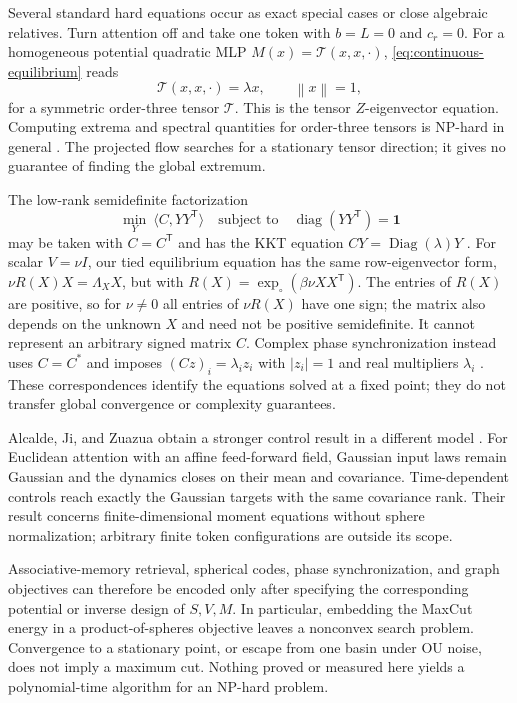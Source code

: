 \documentclass[11pt,a4paper]{article}
\theoremstyle{definition}
\newcommand{\T}{\mathsf T}
\newcommand{\norm}[1]{\left\lVert #1\right\rVert}
\newcommand{\one}{\bm 1}
\newcommand{\diag}{\operatorname{diag}}
\newcommand{\Diag}{\operatorname{Diag}}
\begin{document}
Several standard hard equations occur as exact special cases or close algebraic
relatives.  Turn attention off and take one token with $b=L=0$ and $c_r=0$.  For a
homogeneous potential quadratic MLP $M(x)=\mathcal T(x,x,\cdot)$,
\eqref{eq:continuous-equilibrium} reads
\begin{equation}
 \mathcal T(x,x,\cdot)=\lambda x,\qquad \norm{x}=1,
 \label{eq:tensor-eigen}
\end{equation}
for a symmetric order-three tensor $\mathcal T$.  This is the tensor
$Z$-eigenvector equation.  Computing extrema and spectral quantities for order-three
tensors is NP-hard in general \cite{hillarlim2013tensor}.  The projected flow searches
for a stationary tensor direction; it gives no guarantee of finding the global
extremum.

The low-rank semidefinite factorization
\begin{equation}
 \min_Y\ \langle C,YY^{\T}\rangle
 \quad\text{subject to}\quad \diag(YY^{\T})=\one
 \label{eq:burer-monteiro}
\end{equation}
may be taken with $C=C^{\T}$ and has the KKT equation
$CY=\Diag(\lambda)Y$
\cite{boumal2018burer}.  For scalar $V=\nu I$, our tied equilibrium equation has the
same row-eigenvector form, $\nu R(X)X=\Lambda_X X$, but with
$R(X)=\exp_\circ(\beta\nu XX^{\T})$.  The entries of $R(X)$ are positive, so for
$\nu\ne0$ all entries of $\nu R(X)$ have one sign; the matrix also depends on the
unknown $X$ and need not be positive semidefinite.  It cannot represent an arbitrary
signed matrix $C$.  Complex phase synchronization instead uses $C=C^*$ and imposes
$(Cz)_i=\lambda_i z_i$ with $|z_i|=1$ and real multipliers $\lambda_i$
\cite{boumal2016phase}.  These correspondences identify the equations solved at a
fixed point; they do not transfer global convergence or complexity guarantees.

Alcalde, Ji, and Zuazua obtain a stronger control result in a different model
\cite{alcalde2026reachability}.  For Euclidean attention with an affine feed-forward
field, Gaussian input laws remain Gaussian and the dynamics closes on their mean and
covariance.  Time-dependent controls reach exactly the Gaussian targets with the same
covariance rank.  Their result concerns finite-dimensional moment equations without
sphere normalization; arbitrary finite token configurations are outside its scope.

Associative-memory retrieval, spherical codes, phase synchronization, and graph
objectives can therefore be encoded only after specifying the corresponding
potential or inverse design of $S,V,M$.  In particular, embedding the MaxCut energy in
a product-of-spheres objective leaves a nonconvex search problem.  Convergence to a
stationary point, or escape from one basin under OU noise, does not imply a maximum
cut.  Nothing proved or measured here yields a polynomial-time algorithm for an
NP-hard problem.
\end{document}
